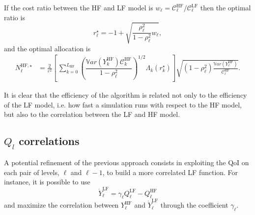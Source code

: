 If the cost ratio between the HF and LF model is $w_{\ell} =  \mathcal{C}_{\ell}^{\mathrm{HF}} / \mathcal{C}_{\ell}^{\mathrm{LF}}$ then the optimal ratio
is 
\begin{equation}
 r_\ell^{\star} = -1 + \sqrt{ \dfrac{\rho_\ell^2}{1-\rho_\ell^2} w_{\ell}},
\end{equation}
and
the optimal allocation is
\begin{equation}
 \begin{split}
  N_{\ell}^{\mathrm{HF},\star} &= \frac{2}{\varepsilon^2} \!\! \left[ \, \sum_{k=0}^{L_{\mathrm{HF}}} 
        \left( \dfrac{ \mathbb{V}ar\left(  Y_k^{ \mathrm{HF} } \right) \mathcal{C}_{k}^{\mathrm{HF}}}{1-\rho_\ell^2} \right)^{1/2} \Lambda_{k}(r_k^{\star}) \right] 
               \sqrt{ \left( 1 - \rho_\ell^2 \right) \frac{ \mathbb{V}ar\left(Y^{\mathrm{HF}}_{\ell}\right) }{\mathcal{C}_{\ell}^{\mathrm{HF}}}}.
\end{split}
\end{equation}
               
               
It is clear that the efficiency of the algorithm is related not only to the efficiency of the LF model, i.e. how fast a simulation runs with respect
to the HF model, but also to the correlation between the LF and HF model.

\subsection{$Q_l$ correlations} \label{uq:sampling:mlmf:Ycorr}

A potential refinement of the previous approach consists in exploiting the QoI on each pair of levels, $\ell$ and $\ell-1$, to 
build a more correlated LF function. For instance, it is possible to use
\begin{equation}
 \mathring{Y}^{\mathrm{LF}}_{\ell} =  \gamma_\ell Q_\ell^{\mathrm{LF}} - Q_\ell^{\mathrm{HF}}
\end{equation}
and maximize the correlation between $Y_\ell^{\mathrm{HF}}$ and $\mathring{Y}^{\mathrm{LF}}_{\ell}$ through the coefficient $\gamma_\ell$.

